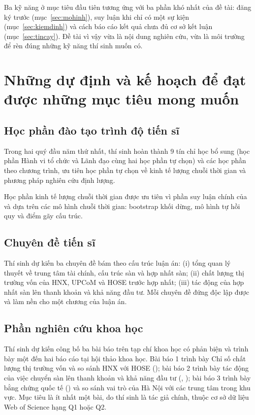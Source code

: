 Ba kỹ năng ở mục tiêu đầu tiên tương ứng với ba phần khó nhất của đề tài: đăng ký trước (mục~\ref{sec:mohinh}), suy luận khi chỉ có một sự kiện (mục~\ref{sec:kiemdinh}) và cách báo cáo kết quả chưa đủ cơ sở kết luận (mục~\ref{sec:tincay}). Đề tài vì vậy vừa là nội dung nghiên cứu, vừa là môi trường để rèn đúng những kỹ năng thí sinh muốn có.

\chapter{Những dự định và kế hoạch để đạt được những mục tiêu mong muốn}\label{ch:7}

\section{Học phần đào tạo trình độ tiến sĩ}

Trong hai quý đầu năm thứ nhất, thí sinh hoàn thành 9 tín chỉ học bổ sung (học phần Hành vi tổ chức và Lãnh đạo cùng hai học phần tự chọn) và các học phần theo chương trình, ưu tiên học phần tự chọn về kinh tế lượng chuỗi thời gian và phương pháp nghiên cứu định lượng.

Học phần kinh tế lượng chuỗi thời gian được ưu tiên vì phần suy luận chính của  và  dựa trên các mô hình chuỗi thời gian: bootstrap khối dừng, mô hình tự hồi quy và điểm gãy cấu trúc.

\section{Chuyên đề tiến sĩ}

Thí sinh dự kiến ba chuyên đề bám theo cấu trúc luận án: (i) tổng quan lý thuyết về trung tâm tài chính, cấu trúc sàn và hợp nhất sàn; (ii) chất lượng thị trường vốn của HNX, UPCoM và HOSE trước hợp nhất; (iii) tác động của hợp nhất sàn lên thanh khoản và khả năng đầu tư. Mỗi chuyên đề đứng độc lập được và làm nền cho một chương của luận án.

\section{Phần nghiên cứu khoa học}\label{sec:nckh}

Thí sinh dự kiến công bố ba bài báo trên tạp chí khoa học có phản biện và trình bày một đến hai báo cáo tại hội thảo khoa học. Bài báo 1 trình bày Chỉ số chất lượng thị trường vốn và so sánh HNX với HOSE (); bài báo 2 trình bày tác động của việc chuyển sàn lên thanh khoản và khả năng đầu tư (, ); bài báo 3 trình bày bằng chứng quốc tế () và so sánh vai trò của Hà Nội với các trung tâm trong khu vực. Mục tiêu là ít nhất một bài, do thí sinh là tác giả chính, thuộc cơ sở dữ liệu Web of Science hạng Q1 hoặc Q2.

